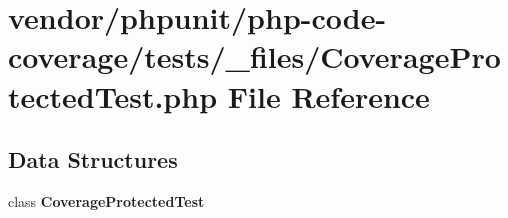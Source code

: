 \section{vendor/phpunit/php-\/code-\/coverage/tests/\+\_\+files/\+Coverage\+Protected\+Test.php File Reference}
\label{php-code-coverage_2tests_2__files_2_coverage_protected_test_8php}
\subsection*{Data Structures}
\begin{DoxyCompactItemize}
\item 
class {\bf Coverage\+Protected\+Test}
\end{DoxyCompactItemize}
